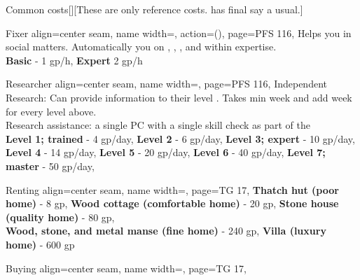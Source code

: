 \begin{PageBack}
\begin{Tables}{\backTableHeight}
\begin{Table}{Common costs}[][These are only reference costs. \GM has final say a usual.]
\begin{entry}{Fixer }{%
                align=center seam,
                name width=\turnLength,%
                action={\BodyFont ()},
                page=PFS 116,
            }
                Helps you in social matters.\hfill
                Automatically  you on , , , and  within expertise.\\
                \textbf{Basic} - 1 gp/h, \quad
                \textbf{Expert}  2 gp/h 
            \end{entry}
            \begin{entry}{Researcher}{%
                align=center seam,
                name width=\turnLength,%
                page=PFS 116,
            }
                Independent Research: Can provide information to their level .\hfill
                Takes min  week and add  week for every level above.\\
                Research assistance:  a single PC with a single skill check as part of the \hfill
                \\
                \textbf{Level 1; trained} - 4 gp/day,\quad
                \textbf{Level 2} - 6 gp/day,\quad
                \textbf{Level 3; expert} - 10 gp/day, \hfill{}\\
                \textbf{Level 4} - 14 gp/day,\hspace{-0.73ex}\hphantom{; trained}\quad
                \textbf{Level 5} - 20 gp/day,\hspace{-0.73ex}\quad
                \textbf{Level 6} - 40 gp/day,\quad
                \textbf{Level 7; master} - 50 gp/day, \quad
            \end{entry}
            \breakLine[Housing]
            \begin{entry}{Renting}{%
                align=center seam,
                name width=\turnLength,%
                page=TG 17,
            }
                \textbf{Thatch hut (poor home)} - 8 gp, \hfill
                \textbf{Wood cottage (comfortable home)} - 20 gp, \hfill
                \textbf{Stone house (quality home)} - 80 gp,\\
                \textbf{Wood, stone, and metal manse (fine home)} - 240 gp, \quad
                \textbf{Villa (luxury home) } - 600 gp \hfill{}
            \end{entry}
            \begin{entry}{Buying}{%
                align=center seam,
                name width=\turnLength,%
                page=TG 17,
            }

\end{entry}
\end{Table}
\end{Tables}
\end{PageBack}

